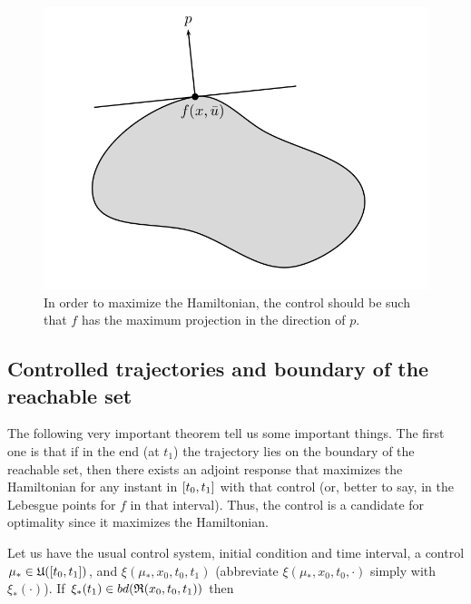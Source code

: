 \begin{figure}[h!]
	\includegraphics[width=\linewidth]{imgs/512-514.png}
	\caption{In order to maximize the Hamiltonian, the control should be such that $f$ has the maximum projection in the direction of $p$.}
	\label{fig-5.2}
\end{figure}

\subsection{Controlled trajectories and boundary of the reachable set}
The following very important theorem tell us some important things. The first one is that if in the end (at $t_1$) the trajectory lies on the boundary of the reachable set, then there exists an adjoint response that maximizes the Hamiltonian for any instant in $[t_0,t_1]$ with that control (or, better to say, in the Lebesgue points for $f$ in that interval). Thus, the control is a candidate for optimality since it maximizes the Hamiltonian. \\

\begin{teo}
	Let us have the usual control system, initial condition and time interval, a control $\mu_*\in\mathfrak{U}([t_0,t_1])$, and $\xi(\mu_*,x_0,t_0,t_1)$ (abbreviate $\xi(\mu_*,x_0,t_0,\cdot)$ simply with $\xi_*(\cdot)$). If $\xi_*(t_1) \in bd(\mathfrak{R}(x_0,t_0,t_1))$ then 
	\label{5-16}
	\label{T10}
\end{teo}

